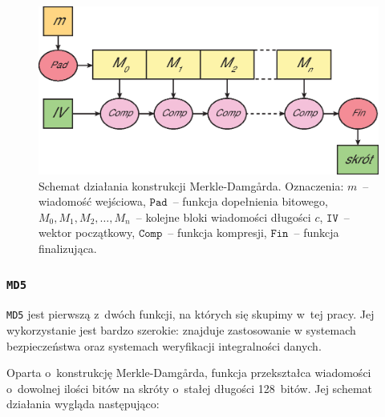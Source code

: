 \documentclass[12pt,a4paper,twoside]{article}
\begin{document}
\begin{figure}[H]
    \includegraphics[width=12cm]{img/merkle_damgard.eps}
    \caption{Schemat działania konstrukcji Merkle-Damg\r{a}rda. Oznaczenia:
    $m$~-- wiadomość wejściowa, $\mathtt{Pad}$~-- funkcja dopełnienia bitowego,
    $M_0, M_1, M_2, \ldots, M_n$~-- kolejne bloki wiadomości długości $c$,
    $\mathtt{IV}$~-- wektor początkowy, $\mathtt{Comp}$~-- funkcja kompresji,
    $\mathtt{Fin}$~-- funkcja finalizująca.}
    \label{fig:merkle_damgard}
\end{figure}



\subsubsection{\texttt{MD5}}
\texttt{MD5} jest pierwszą z~dwóch funkcji, na których się skupimy w~tej pracy.
Jej wykorzystanie jest bardzo szerokie: znajduje zastosowanie w systemach
bezpieczeństwa oraz systemach weryfikacji integralności danych.

Oparta o~konstrukcję Merkle-Damg\r{a}rda, funkcja przekształca wiadomości
o~dowolnej ilości bitów na skróty o~stałej długości 128~bitów. Jej schemat
działania wygląda następująco:
\end{document}
